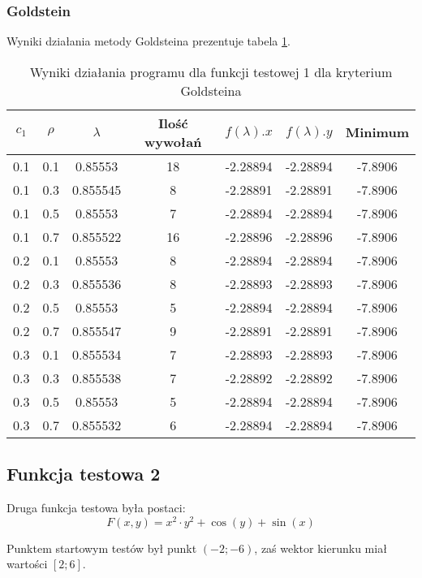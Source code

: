 \documentclass{classrep}
\begin{document}
\subsubsection{Goldstein}

Wyniki działania metody Goldsteina prezentuje tabela \ref{goldstein1}.

\begin{table}
  \centering
  \caption{Wyniki działania programu dla funkcji testowej 1 dla kryterium Goldsteina}
  \label{goldstein1}
  \begin{tabular}{|c|c|c|c|c|c|c|}
    \hline
    $c_1$ & $\rho$ & $\lambda$ & Ilość wywołań & $f(\lambda).x$ & $f(\lambda).y$ & Minimum \\
    \hline
    0.1 & 0.1 & 0.85553 & 18 & -2.28894 & -2.28894 & -7.8906 \\
    0.1 & 0.3 & 0.855545 & 8 & -2.28891 & -2.28891 & -7.8906 \\
    0.1 & 0.5 & 0.85553 & 7 & -2.28894 & -2.28894 & -7.8906 \\
    0.1 & 0.7 & 0.855522 & 16 & -2.28896 & -2.28896 & -7.8906 \\
    0.2 & 0.1 & 0.85553 & 8 & -2.28894 & -2.28894 & -7.8906 \\
    0.2 & 0.3 & 0.855536 & 8 & -2.28893 & -2.28893 & -7.8906 \\
    0.2 & 0.5 & 0.85553 & 5 & -2.28894 & -2.28894 & -7.8906 \\
    0.2 & 0.7 & 0.855547 & 9 & -2.28891 & -2.28891 & -7.8906 \\
    0.3 & 0.1 & 0.855534 & 7 & -2.28893 & -2.28893 & -7.8906 \\
    0.3 & 0.3 & 0.855538 & 7 & -2.28892 & -2.28892 & -7.8906 \\
    0.3 & 0.5 & 0.85553 & 5 & -2.28894 & -2.28894 & -7.8906 \\
    0.3 & 0.7 & 0.855532 & 6 & -2.28894 & -2.28894 & -7.8906 \\
    \hline
  \end{tabular}
\end{table}


\subsection{Funkcja testowa 2}
Druga funkcja testowa była postaci:
\begin{equation}
 F(x, y) = x^2 \cdot y^2 + \cos(y) + \sin(x)
\end{equation}

Punktem startowym testów był punkt $(-2; -6)$, zaś wektor kierunku miał wartości $[2; 6]$.
\end{document}
